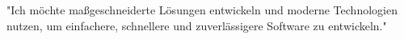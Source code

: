 \documentclass{resume}
\begin{document}
\begin{center}
    \small "Ich möchte maßgeschneiderte Lösungen entwickeln und moderne Technologien nutzen, um einfachere, schnellere und zuverlässigere Software zu entwickeln."



\end{center}
\end{document}

